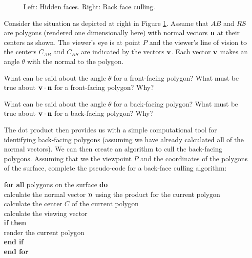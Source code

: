 \begin{center}
\begin{figure}[ht] 
\begin{center}
 \hspace{0.5in} 
\caption{Left: Hidden faces. Right: Back face culling.}
\label{F:Hidden}
\end{center}
\end{figure}
\end{center}

\begin{pactivity} \label{act:bf_dot_product} Consider the situation as depicted at right in Figure \ref{F:Hidden}. Assume that $AB$ and $RS$ are polygons (rendered one dimensionally here) with normal vectors $\mathbf{n}$ at their centers as shown. The viewer's eye is at point $P$ and the viewer's line of vision to the centers $C_{AB}$ and $C_{RS}$ are indicated by the vectors $\mathbf{v}$. Each vector $\mathbf{v}$ makes an angle $\theta$ with the normal to the polygon. 
	\ba
	\item What can be said about the angle $\theta$ for a front-facing polygon? What must be true about $\mathbf{v} \cdot \mathbf{n}$ for a front-facing polygon? Why?

	
	\item What can be said about the angle $\theta$ for a back-facing polygon? What must be true about $\mathbf{v} \cdot \mathbf{n}$ for a back-facing polygon? Why?


	\item The dot product then provides us with a simple computational tool for identifying back-facing polygons (assuming we have already calculated all of the normal vectors). We can then create an algorithm to cull the back-facing polygons. Assuming that we the viewpoint $P$ and the coordinates of the polygons of the surface, complete the pseudo-code for a back-face culling algorithm:

\noindent \textbf{for all} polygons on the surface \textbf{do} \\
\-\hspace{0.25in} 	calculate the normal vector $\mathbf{n}$ using the \underline{\hspace{0.5in}} product for the current polygon \\
\-\hspace{0.25in} 	calculate the center $C$ of the current polygon \\
\-\hspace{0.25in} 	calculate the viewing vector \underline{\hspace{1in}} \\
\-\hspace{0.5in}	\textbf{if}  \underline{\hspace{1in}} \textbf{then} \\
\-\hspace{0.75in}		render the current polygon \\
\-\hspace{0.5in} 	\textbf{end if} \\
\textbf{end for}
	

	\ea

\end{pactivity} 

